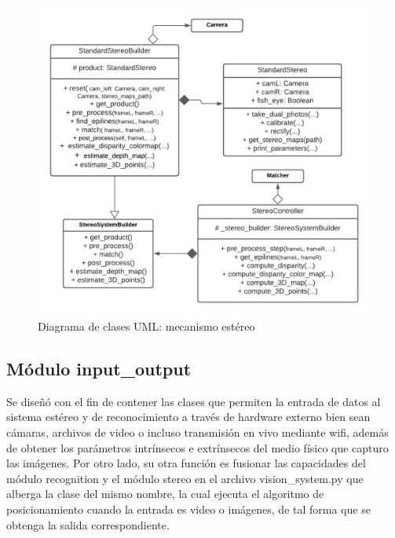 \begin{figure}[H]
    \centering
    \includegraphics[scale=0.5]{Recursos/builder_uml.png}
    \caption{Diagrama de clases UML: mecanismo estéreo}
    \label{builder_stereo_uml}
\end{figure}
\subsection{Módulo input\_output}
Se diseñó con el fin de contener las clases que permiten la entrada de datos al sistema estéreo y de reconocimiento a través de hardware externo bien sean cámaras, archivos de video o incluso transmisión en vivo mediante wifi, además de obtener los parámetros intrínsecos e extrínsecos del medio físico que capturo las imágenes. Por otro lado, su otra función es fusionar las capacidades del módulo recognition y el módulo stereo en el archivo vision\_system.py que alberga la clase del mismo nombre, la cual ejecuta el algoritmo de posicionamiento cuando la entrada es video o imágenes, de tal forma que se obtenga la salida correspondiente.